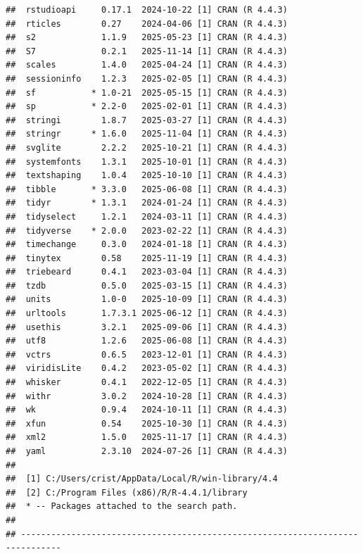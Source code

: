 \documentclass[sn-apa,pdflatex]{sn-jnl}
\begin{document}
\begin{verbatim}
##  rstudioapi     0.17.1  2024-10-22 [1] CRAN (R 4.4.3)
##  rticles        0.27    2024-04-06 [1] CRAN (R 4.4.3)
##  s2             1.1.9   2025-05-23 [1] CRAN (R 4.4.3)
##  S7             0.2.1   2025-11-14 [1] CRAN (R 4.4.3)
##  scales         1.4.0   2025-04-24 [1] CRAN (R 4.4.3)
##  sessioninfo    1.2.3   2025-02-05 [1] CRAN (R 4.4.3)
##  sf           * 1.0-21  2025-05-15 [1] CRAN (R 4.4.3)
##  sp           * 2.2-0   2025-02-01 [1] CRAN (R 4.4.3)
##  stringi        1.8.7   2025-03-27 [1] CRAN (R 4.4.3)
##  stringr      * 1.6.0   2025-11-04 [1] CRAN (R 4.4.3)
##  svglite        2.2.2   2025-10-21 [1] CRAN (R 4.4.3)
##  systemfonts    1.3.1   2025-10-01 [1] CRAN (R 4.4.3)
##  textshaping    1.0.4   2025-10-10 [1] CRAN (R 4.4.3)
##  tibble       * 3.3.0   2025-06-08 [1] CRAN (R 4.4.3)
##  tidyr        * 1.3.1   2024-01-24 [1] CRAN (R 4.4.3)
##  tidyselect     1.2.1   2024-03-11 [1] CRAN (R 4.4.3)
##  tidyverse    * 2.0.0   2023-02-22 [1] CRAN (R 4.4.3)
##  timechange     0.3.0   2024-01-18 [1] CRAN (R 4.4.3)
##  tinytex        0.58    2025-11-19 [1] CRAN (R 4.4.3)
##  triebeard      0.4.1   2023-03-04 [1] CRAN (R 4.4.3)
##  tzdb           0.5.0   2025-03-15 [1] CRAN (R 4.4.3)
##  units          1.0-0   2025-10-09 [1] CRAN (R 4.4.3)
##  urltools       1.7.3.1 2025-06-12 [1] CRAN (R 4.4.3)
##  usethis        3.2.1   2025-09-06 [1] CRAN (R 4.4.3)
##  utf8           1.2.6   2025-06-08 [1] CRAN (R 4.4.3)
##  vctrs          0.6.5   2023-12-01 [1] CRAN (R 4.4.3)
##  viridisLite    0.4.2   2023-05-02 [1] CRAN (R 4.4.3)
##  whisker        0.4.1   2022-12-05 [1] CRAN (R 4.4.3)
##  withr          3.0.2   2024-10-28 [1] CRAN (R 4.4.3)
##  wk             0.9.4   2024-10-11 [1] CRAN (R 4.4.3)
##  xfun           0.54    2025-10-30 [1] CRAN (R 4.4.3)
##  xml2           1.5.0   2025-11-17 [1] CRAN (R 4.4.3)
##  yaml           2.3.10  2024-07-26 [1] CRAN (R 4.4.3)
## 
##  [1] C:/Users/crist/AppData/Local/R/win-library/4.4
##  [2] C:/Program Files (x86)/R/R-4.4.1/library
##  * -- Packages attached to the search path.
## 
## ------------------------------------------------------------------------------
\end{verbatim}

\newpage


\end{document}
